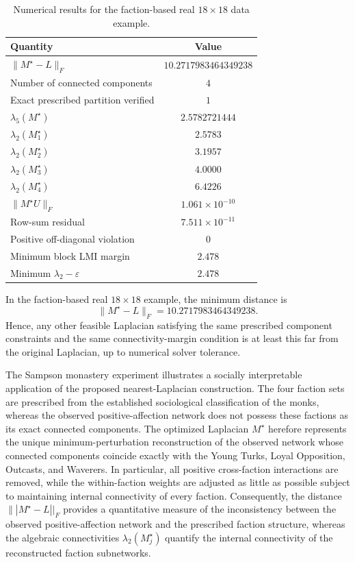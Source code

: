 \documentclass[11pt]{article}
\begin{document}
{\begin{table}[H]
    \centering
    \caption{Numerical results for the faction-based real $18\times18$ data example.}
    \label{tab:real18_faction}
    \begin{tabular}{lc}
        \hline
        Quantity & Value \\
        \hline
        $\|M^\star-L\|_F$ & $10.2717983464349238$ \\
        Number of connected components & $4$ \\
        Exact prescribed partition verified & $1$ \\
        $\lambda_5(M^\star)$ & $2.5782721444$ \\
        $\lambda_2(M^\star_1)$ & $2.5783$ \\
        $\lambda_2(M^\star_2)$ & $3.1957$ \\
        $\lambda_2(M^\star_3)$ & $4.0000$ \\
        $\lambda_2(M^\star_4)$ & $6.4226$ \\
        $\|M^\star U\|_F$ & $1.061\times 10^{-10}$ \\
        Row-sum residual & $7.511\times 10^{-11}$ \\
        Positive off-diagonal violation & $0$ \\
        Minimum block LMI margin & $2.478$ \\
        Minimum $\lambda_2-\varepsilon$ & $2.478$ \\
        \hline
    \end{tabular}
\end{table}

In the faction-based real $18\times18$ example, the minimum distance is
\[
\|M^\star-L\|_F=10.2717983464349238.
\]
Hence, any other feasible Laplacian satisfying the same prescribed component
constraints and the same connectivity-margin condition is at least this far
from the original Laplacian, up to numerical solver tolerance.

The Sampson monastery experiment illustrates a socially interpretable application of the proposed nearest-Laplacian construction. The four faction sets are prescribed from the established sociological classification of the monks, whereas the observed positive-affection network does not possess these factions as its exact connected components. The optimized Laplacian $M^\star $ herefore represents the unique minimum-perturbation reconstruction of the observed network whose connected components coincide exactly with the Young Turks, Loyal Opposition, Outcasts, and Waverers. In particular, all positive cross-faction interactions are removed, while the within-faction weights are adjusted as little as possible subject to maintaining internal connectivity of every faction. Consequently, the distance $\||M^\star - L||_F$  provides a quantitative measure of the inconsistency between the observed positive-affection network and the prescribed faction structure, whereas the algebraic connectivities  $\lambda_2(M^\star_j)$ quantify the internal connectivity of the reconstructed faction subnetworks.

}
\end{document}
